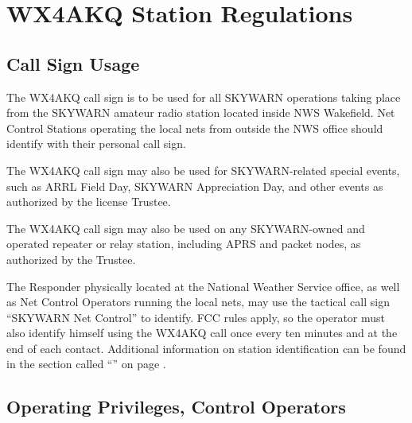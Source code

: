 \documentclass[pdflatex,letterpaper,twoside,12pt]{book}
\begin{document}

\chapter{WX4AKQ Station Regulations}


\section{Call Sign Usage}\label{wx4akq-usage}

The WX4AKQ call sign is to be used for all SKYWARN operations taking place from the SKYWARN amateur radio station located inside NWS Wakefield.  Net Control Stations operating the local nets from outside the NWS office should identify with their personal call sign. 

The WX4AKQ call sign may also be used for SKYWARN-related special events, such as ARRL Field Day, SKYWARN Appreciation Day, and other events as authorized by the license Trustee. 

The WX4AKQ call sign may also be used on any SKYWARN-owned and operated repeater or relay station, including APRS and packet nodes, as authorized by the Trustee.

The Responder physically located at the National Weather Service office, as well as Net Control Operators running the local nets, may use the tactical call sign ``SKYWARN Net Control'' to identify.  FCC rules apply, so the operator must also identify himself using the WX4AKQ call once every ten minutes and at the end of each contact.  Additional information on station identification can be found in the section called ``'' on page \pageref{nco-station-id}.


\section{Operating Privileges, Control Operators}
\end{document}
